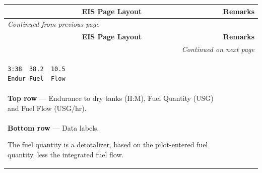 \newlength{\eistableleftcol} 
\setlength{\eistableleftcol}{1.2in}
\newlength{\eistablerightcol} 
\setlength{\eistablerightcol}{\textwidth-\eistableleftcol-0.35in}
\begin{longtable}
	{|l|l|} \hline \multicolumn{1}{|c|}{\bfseries{EIS Page Layout}}&\multicolumn{1}{c|}{\bfseries{Remarks}}\\
	\hline\hline
\endfirsthead \multicolumn{2}{l}{\emph{Continued from previous page}}\\
\hline \multicolumn{1}{|c|}{\bfseries{EIS Page Layout}}&\multicolumn{1}{c|}{\bfseries{Remarks}}\\
\hline\hline 
\endhead \hline \multicolumn{2}{r}{\hfill \emph{Continued on next page}}\\
\endfoot \hline 
\endlastfoot

\begin{minipage}{\eistableleftcol}\ttfamily 
\begin{verbatim}3:38  38.2  10.5
Endur Fuel  Flow\end{verbatim}
\end{minipage}&
\begin{minipage}{\eistablerightcol}
\vspace{\tabletopspace}
\textbf{Fuel Page }\\
\textbf{Top row} --- Endurance to dry tanks (H:M), Fuel Quantity (USG) and Fuel Flow (USG/hr).\\
\textbf{Bottom row} --- Data labels.

The fuel quantity is a detotalizer, based on the pilot-entered fuel quantity, less the integrated fuel flow.

% 
\vspace{\tablebottomspace}
\end{minipage}\\
\hline


\end{longtable}
